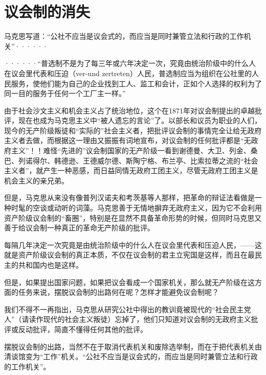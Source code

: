 \chapter{议会制的消失} %


\pskip
\leftskip=10mm
\small

马克思写道：“公社不应当是议会式的，而应当是同时兼管立法和行政的工作机关”······

······“普选制不是为了每三年或六年决定一次，究竟由统治阶级中的什么人在议会里代表和压迫（ver-und zertreten）人民，普选制应当为组织在公社里的人民服务，使他们能为自己的企业找到工人、监工和会计，正如个人选择的权利为了同一目的服务于任何一个工厂主一样。”

\normalsize
\leftskip=0mm
\pskip

由于社会沙文主义和机会主义占了统治地位，这个在1871年对议会制提出的卓越批评，现在也成为马克思主义中“被人遗忘的言论”了。以部长和议员为职业的人们，现今的无产阶级叛徒和“实际的”社会主义者，把批评议会制的事情完全让给无政府主义者去做，而根据这一理由又振振有词地宣布，对议会制的{\kaishu 任何}批评都是“无政府主义”！！难怪“先进的”议会制国家的无产阶级一看到谢德曼、大卫、列金、桑巴、列诺得尔、韩德逊、王德威尔德、斯陶宁格、布兰亭、比索拉蒂之流的“社会主义者”，就产生一种恶感，而日益同情无政府工团主义，尽管无政府工团主义是机会主义的亲兄弟。

但是，马克思从来没有像普列汉诺夫和考茨基等人那样，把革命的辩证法看做是一种时髦的空谈或动听的词藻。马克思善于无情地摒弃无政府主义，因为它不会利用资产阶级议会制的“畜圈”，特别是在显然不具备革命形势的时候，但同时马克思又善于给议会制一种真正的革命无产阶级的批评。

每隔几年决定一次究竟是由统治阶级中的什么人在议会里代表和压迫人民，——这就是资产阶级议会制的真正本质，不仅在议会制的君主立宪国是这样，而且在最民主的共和国内也是这样。

但是，如果提出国家问题，如果把议会看成一个国家机关，那么就无产阶级在{\kaishu 这}方面的任务来说，摆脱议会制的出路何在呢？怎样才能避免议会制呢？

我们不得不一再指出，马克思从研究公社中得出的教训竟被现代的“社会民主党人”（请读作现代的社会主义叛徒）忘掉了，他们只知道对议会制的无政府主义批评或反动批评，简直不懂得任何其他的批评。

摆脱议会制的出路，当然不在于取消代表机关和废除选举制，而在于把代表机关由清谈馆变为“工作”机关。“公社不应当是议会式的，而应当是同时兼管立法和行政的工作机关”。

